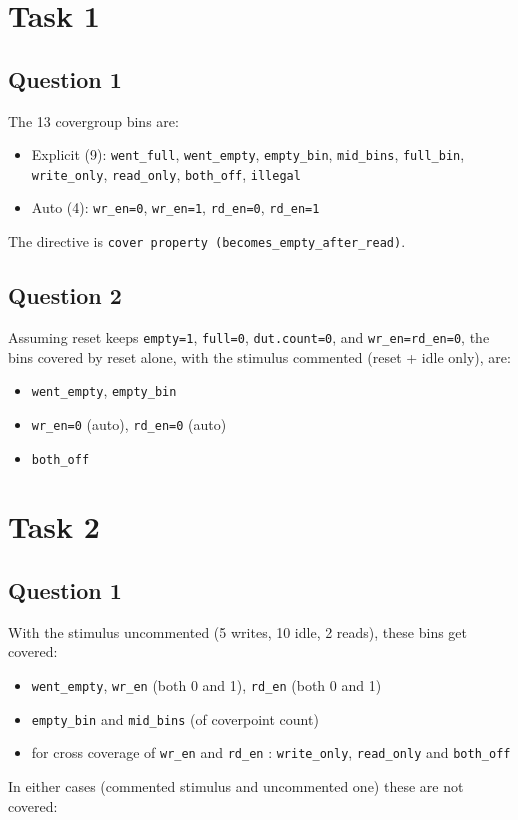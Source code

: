 \documentclass{article}
\begin{document}
\section*{Task 1}

\subsection*{Question 1}

The 13 covergroup bins are:
\begin{itemize}
    \item Explicit (9): \texttt{went\_full}, \texttt{went\_empty}, \texttt{empty\_bin}, \texttt{mid\_bins}, \texttt{full\_bin}, \texttt{write\_only}, \texttt{read\_only}, \texttt{both\_off}, \texttt{illegal} 
    \item Auto (4): \texttt{wr\_en=0}, \texttt{wr\_en=1}, \texttt{rd\_en=0}, \texttt{rd\_en=1}
\end{itemize}
The directive is \texttt{cover property (becomes\_empty\_after\_read)}.

\subsection*{Question 2}

Assuming reset keeps \texttt{empty=1}, \texttt{full=0}, \texttt{dut.count=0}, and \texttt{wr\_en=rd\_en=0}, the bins covered by reset alone, with the stimulus commented (reset + idle only), are:
\begin{itemize}
  \item \texttt{went\_empty}, \texttt{empty\_bin}
  \item \texttt{wr\_en=0} (auto), \texttt{rd\_en=0} (auto)
  \item \texttt{both\_off}
\end{itemize}

\section*{Task 2}

\subsection*{Question 1}

With the stimulus uncommented (5 writes, 10 idle, 2 reads), these bins get covered:

\begin{itemize}
  \item \texttt{went\_empty}, \texttt{wr\_en} (both 0 and 1), \texttt{rd\_en} (both 0 and 1)
  \item \texttt{empty\_bin} and \texttt{mid\_bins} (of coverpoint count)
  \item for cross coverage of \texttt{wr\_en} and \texttt{rd\_en} : \texttt{write\_only}, \texttt{read\_only} and \texttt{both\_off}
\end{itemize} 
In either cases (commented stimulus and uncommented one) these are not covered: 
\end{document}
